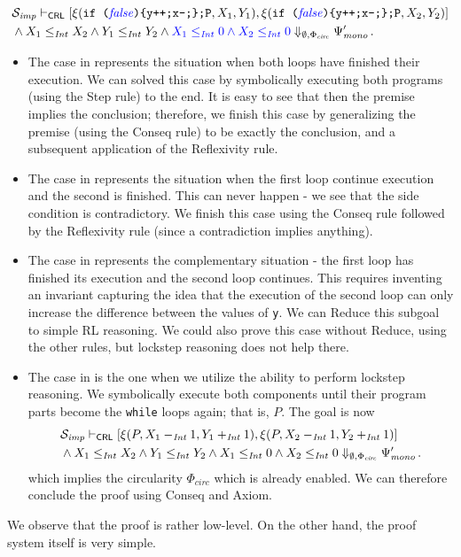 \begin{equation}\label{ex:case4}
\begin{aligned}
  & \mathcal{S}_{\mathit{imp}} \vdash_{\mathsf{CRL}}
  [ \xi(\texttt{if (}{\color{blue}\mathit{false}}\texttt{)\{y++;x--;\};P}, X_1, Y_1) ,  
    \xi(\texttt{if (}{\color{blue}\mathit{false}}\texttt{)\{y++;x--;\};P}, X_2, Y_2) ] \\
  & \land X_1 \leq_{\mathit{Int}} X_2 \land Y_1 \leq_{\mathit{Int}} Y_2 \land {\color{blue} X_1 \leq_{\mathit{Int}} 0 \land X_2 \leq_{\mathit{Int}} 0 }
  \Downarrow_{\emptyset, \Phi_{\mathit{circ}}} \Psi^\prime_{\mathit{mono}} \, .
\end{aligned}
\end{equation}
\begin{itemize}
\item The case in  represents the situation when both loops have finished their execution.
We can solved this case by symbolically executing both programs (using the Step rule) to the end.
It is easy to see that then the premise implies the conclusion; therefore, we finish this case
by generalizing the premise (using the Conseq rule) to be exactly the conclusion, and a subsequent application
of the Reflexivity rule.
\item The case in  represents the situation when the first loop continue execution and the second is finished.
      This can never happen - we see that the side condition is contradictory.
      We finish this case using the Conseq rule followed by the Reflexivity rule (since a contradiction implies anything).
\item The case in  represents the complementary situation - the first loop has finished its execution
      and the second loop continues.
      This requires inventing an invariant capturing the idea that the execution of the second loop can only increase
      the difference between the values of \texttt{y}.
      We can Reduce this subgoal to simple RL reasoning. We could also prove this case without Reduce,
      using the other rules, but lockstep reasoning does not help there.
\item The case in  is the one when we utilize the ability to perform lockstep reasoning.
      We symbolically execute both components until their program parts become the \texttt{while} loops again;
      that is, $P$.
      The goal is now
      \begin{align*}
        & \mathcal{S}_{\mathit{imp}} \vdash_{\mathsf{CRL}}
        [ \xi(P, X_1 -_{\mathit{Int}} 1, Y_1 +_{\mathit{Int}} 1 ) ,  
          \xi(P, X_2 -_{\mathit{Int}} 1, Y_2 +_{\mathit{Int}} 1) ] \\
        & \land X_1 \leq_{\mathit{Int}} X_2 \land Y_1 \leq_{\mathit{Int}} Y_2 \land {X_1 \leq_{\mathit{Int}} 0 \land X_2 \leq_{\mathit{Int}} 0 }
        \Downarrow_{\emptyset, \Phi_{\mathit{circ}}} \Psi^\prime_{\mathit{mono}} \, .
      \end{align*}
      which implies the circularity $\Phi_{\mathit{circ}}$ which is already enabled.
      We can therefore conclude the proof using Conseq and Axiom.
\end{itemize}
We observe that the proof is rather low-level.
On the other hand, the proof system itself is very simple.

